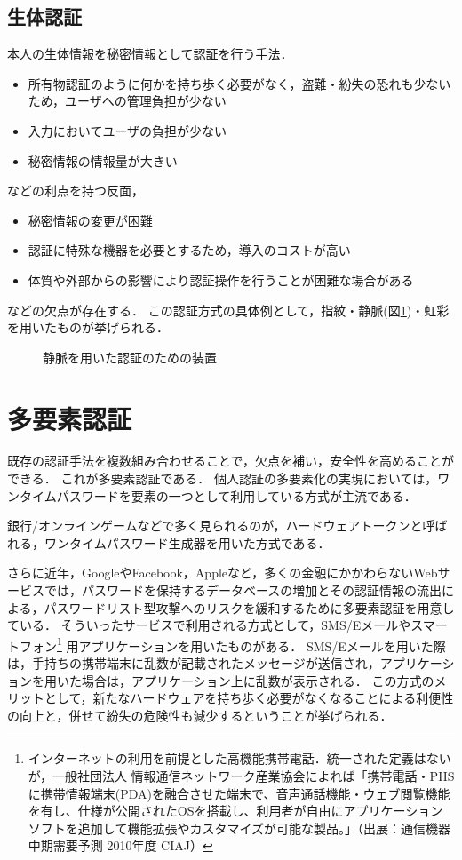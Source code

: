 \subsection{生体認証}\label{subsec:inherence}
本人の生体情報を秘密情報として認証を行う手法．
\begin{itemize}
\item 所有物認証のように何かを持ち歩く必要がなく，盗難・紛失の恐れも少ないため，ユーザへの管理負担が少ない
\item 入力においてユーザの負担が少ない
\item 秘密情報の情報量が大きい
\end{itemize}
などの利点を持つ反面，
\begin{itemize}
\item 秘密情報の変更が困難
\item 認証に特殊な機器を必要とするため，導入のコストが高い
\item 体質や外部からの影響により認証操作を行うことが困難な場合がある
\end{itemize}
などの欠点が存在する．
この認証方式の具体例として，指紋・静脈(図\ref{fig:veinAuth})・虹彩を用いたものが挙げられる．

\begin{figure}[th]
\begin{center}
\end{center}
\caption{静脈を用いた認証のための装置}
\label{fig:veinAuth}
\end{figure}

\section{多要素認証}\label{sec:2factor}
既存の認証手法を複数組み合わせることで，欠点を補い，安全性を高めることができる．
これが多要素認証である．
個人認証の多要素化の実現においては，ワンタイムパスワードを要素の一つとして利用している方式が主流である\cite{DBLP:journals/corr/CristofaroDFN13}．

銀行/オンラインゲームなどで多く見られるのが，ハードウェアトークンと呼ばれる，ワンタイムパスワード生成器を用いた方式である．

さらに近年，GoogleやFacebook，Appleなど，多くの金融にかかわらないWebサービスでは，パスワードを保持するデータベースの増加とその認証情報の流出による，パスワードリスト型攻撃へのリスクを緩和するために多要素認証を用意している．
そういったサービスで利用される方式として，SMS/Eメールやスマートフォン\footnote{インターネットの利用を前提とした高機能携帯電話．統一された定義はないが，一般社団法人 情報通信ネットワーク産業協会によれば「携帯電話・PHSに携帯情報端末(PDA)を融合させた端末で、音声通話機能・ウェブ閲覧機能を有し、仕様が公開されたOSを搭載し、利用者が自由にアプリケーションソフトを追加して機能拡張やカスタマイズが可能な製品。」（出展：通信機器中期需要予測 2010年度 CIAJ）} 用アプリケーションを用いたものがある．
SMS/Eメールを用いた際は，手持ちの携帯端末に乱数が記載されたメッセージが送信され，アプリケーションを用いた場合は，アプリケーション上に乱数が表示される．
この方式のメリットとして，新たなハードウェアを持ち歩く必要がなくなることによる利便性の向上と，併せて紛失の危険性も減少するということが挙げられる．

